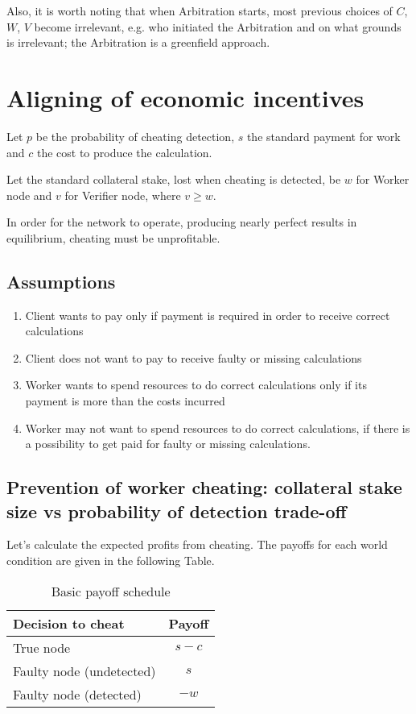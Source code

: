 \documentclass{article}
\begin{document}
Also, it is worth noting that when Arbitration starts, most previous choices of $C$, $W$, $V$ become irrelevant, e.g. who initiated the Arbitration and on what grounds is irrelevant; the Arbitration is a greenfield approach.

\section{Aligning of economic incentives}

Let $p$ be the probability of cheating detection, $s$ the standard payment for work and $c$ the cost to produce the calculation.

Let the standard collateral stake, lost when cheating is detected, be $w$ for Worker node and $v$ for Verifier node, where $v \geq w$.

In order for the network to operate, producing nearly perfect results in equilibrium, cheating must be unprofitable.

\subsection{Assumptions}

\begin{enumerate}
    \item 
        Client wants to pay only if payment is required in order to receive correct calculations
    \item 
        Client does not want to pay to receive faulty or missing calculations
    \item 
        Worker wants to spend resources to do correct calculations only if its payment is more than the costs incurred
    \item 
        Worker may not want to spend resources to do correct calculations, if there is a possibility to get paid for faulty or missing calculations.
\end{enumerate}

\subsection{Prevention of worker cheating: collateral stake size vs probability of detection trade-off}

Let's calculate the expected profits from cheating. The payoffs for each world condition are given in the following Table.

\begin{table}[h]
    \caption{Basic payoff schedule}
    \label{table:settlement}
    \begin{adjustbox}{center}
        \begin{tabular}{l c}
            \toprule
            Decision to cheat & Payoff \\
            \midrule
            True node & $s-c$ \\
            Faulty node (undetected) & $s$ \\
            Faulty node (detected) & $-w$ \\
            \bottomrule
        \end{tabular}
    \end{adjustbox}
\end{table}
\end{document}
